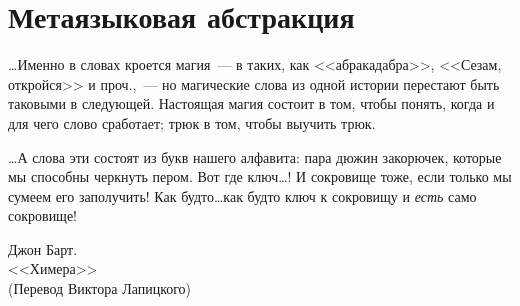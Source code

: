 \chapter{Метаязыковая абстракция}
\label{METALINGUISTIC-ABSTRACTION}%
\thispagestyle{empty}
\epigraph{

\ldots Именно в словах кроется магия~--- в таких, как
<<абракадабра>>, <<Сезам, откройся>> и проч.,~--- но магические слова
из одной истории перестают быть таковыми в следующей.  Настоящая магия
состоит в том, чтобы понять, когда и для чего слово сработает; трюк в
том, чтобы выучить трюк.

\ldots А слова эти состоят из букв нашего алфавита: пара
дюжин закорючек, которые мы способны черкнуть пером.  Вот где ключ\ldots!
И сокровище тоже, если только мы сумеем его заполучить!  Как
будто\ldots как будто ключ к сокровищу и {\em есть} само
сокровище!}
{Джон Барт. \\ <<Химера>> \\ (Перевод Виктора Лапицкого)}

